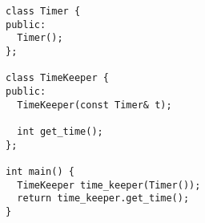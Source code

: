 \documentclass[11pt]{article}
\author{Zongxiong Chen}
\date{\today}
\title{}
\begin{document}
\tableofcontents

\begin{verbatim}
class Timer {
public:
  Timer();
};

class TimeKeeper {
public:
  TimeKeeper(const Timer& t);

  int get_time();
};

int main() {
  TimeKeeper time_keeper(Timer());
  return time_keeper.get_time();
}
\end{verbatim}
\end{document}
